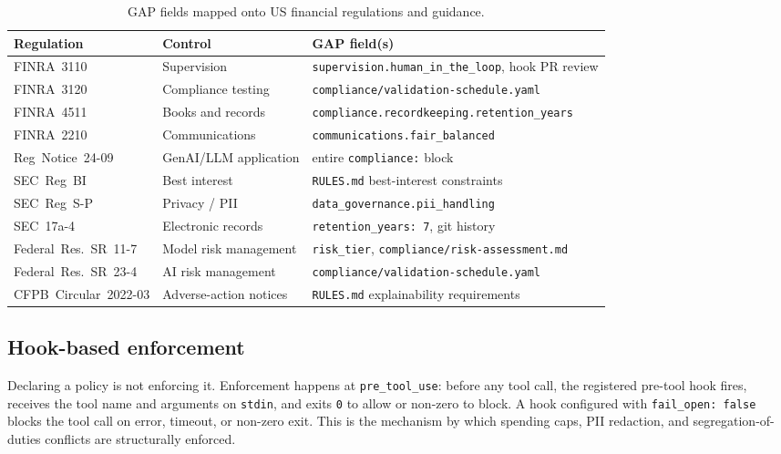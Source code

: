 \documentclass[11pt,a4paper]{article}
\begin{document}
\begin{table}[h]
\centering
\footnotesize
\begin{tabular}{@{}lll@{}}
\toprule
Regulation & Control & GAP field(s) \\
\midrule
FINRA~3110          & Supervision           & \texttt{supervision.human\_in\_the\_loop}, hook PR review \\
FINRA~3120          & Compliance testing    & \texttt{compliance/validation-schedule.yaml} \\
FINRA~4511          & Books and records     & \texttt{compliance.recordkeeping.retention\_years} \\
FINRA~2210          & Communications        & \texttt{communications.fair\_balanced} \\
Reg~Notice~24-09    & GenAI/LLM application & entire \texttt{compliance:} block \\
SEC~Reg~BI          & Best interest         & \texttt{RULES.md} best-interest constraints \\
SEC~Reg~S-P         & Privacy / PII         & \texttt{data\_governance.pii\_handling} \\
SEC~17a-4           & Electronic records    & \texttt{retention\_years: 7}, git history \\
Federal~Res.~SR~11-7& Model risk management & \texttt{risk\_tier}, \texttt{compliance/risk-assessment.md} \\
Federal~Res.~SR~23-4& AI risk management    & \texttt{compliance/validation-schedule.yaml} \\
CFPB~Circular~2022-03 & Adverse-action notices & \texttt{RULES.md} explainability requirements \\
\bottomrule
\end{tabular}
\caption{GAP fields mapped onto US financial regulations and guidance.}
\label{tab:regs}
\end{table}

\subsection{Hook-based enforcement}\label{sec:hook-enforcement}

Declaring a policy is not enforcing it. Enforcement happens at \texttt{pre\_tool\_use}:
before any tool call, the registered pre-tool hook fires, receives the tool name and
arguments on \texttt{stdin}, and exits \texttt{0} to allow or non-zero to block. A
hook configured with \texttt{fail\_open: false} blocks the tool call on error, timeout,
or non-zero exit. This is the mechanism by which spending caps, PII redaction, and
segregation-of-duties conflicts are structurally enforced.
\end{document}
